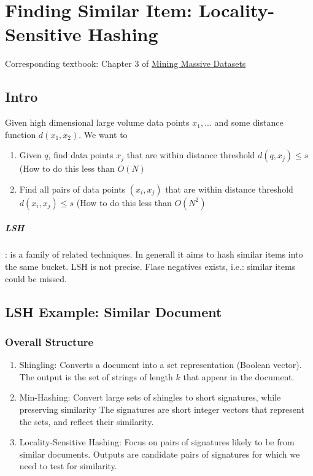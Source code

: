 \chapter{Finding Similar Item: Locality-Sensitive Hashing}
Corresponding textbook:  Chapter 3 of \href{http://www.mmds.org/}{Mining Massive Datasets}


\section{Intro} 
Given high dimensional large volume data points $x_1, ...$ and some distance function $d(x_1, x_2)$. We want to
    \begin{enumerate}
        \item Given $q$, find data points $x_j$ that are within distance threshold $d(q, x_j) \leq s$ (How to do this less than $O(N)$
        \item Find all pairs of data points $(x_i, x_j)$ that are within distance threshold $d(x_i, x_j) \leq s$ (How to do this less than $O(N^2)$
    \end{enumerate}

\paragraph{LSH}: is a family of related techniques. In generall it aims to hash similar items into the same bucket. LSH is not precise. Flase negatives exists, i.e.: similar items could be missed. 


\section{LSH Example: Similar Document} 


\subsection{Overall Structure} 
    \begin{enumerate}
        \item Shingling:  Converts a document into a set representation (Boolean vector). The output is the set of strings of length $k$ that appear in the document. 
        \item Min-Hashing: Convert large sets of shingles to short signatures, while preserving similarity The signatures are short integer vectors that represent the sets, and reflect their similarity. 
        \item Locality-Sensitive Hashing: Focus on pairs of signatures likely to be from similar documents. Outputs are candidate pairs of signatures for which we need to test for similarity. 
    \end{enumerate}
    

